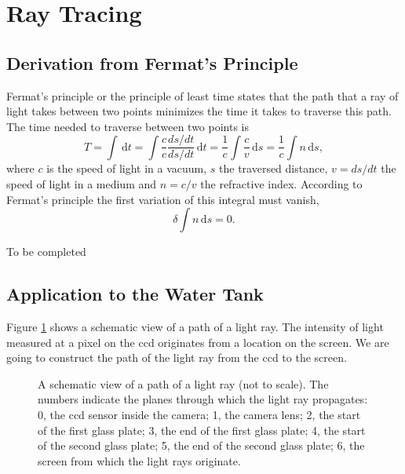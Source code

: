 \documentclass{article}
\begin{document}
\section{Ray Tracing}

\subsection{Derivation from Fermat's Principle}
Fermat's principle or the principle of least time states that the path that a ray of light takes between two points minimizes the time it takes to traverse this path. The time needed to traverse between two points is
\begin{equation}
	T = \int \! \, \mathrm{d}t = \int \! \frac{c}{c} \frac{d s / d t}{d s / d t} \, \mathrm{d}t = \frac{1}{c} \int \! \frac{c}{v} \, \mathrm{d}s = \frac{1}{c} \int \! n \, \mathrm{d}s,
	\end{equation}
where $c$ is the speed of light in a vacuum, $s$ the traversed distance, $v = d s / d t$ the speed of light in a medium and $n = c / v$ the refractive index. According to Fermat's principle the first variation of this integral must vanish,
\begin{equation}
	\delta \int \! n \, \mathrm{d} s = 0.
\end{equation}

\vspace{1cm}
To be completed 
\vspace{1cm}

\subsection{Application to the Water Tank}
Figure \ref{fig:schviepalira} shows a schematic view of a path of a light ray. The intensity of light measured at a pixel on the ccd originates from a location on the screen. We are going to construct the path of the light ray from the ccd to the screen.

\begin{figure}[hpbt]
	
	\caption{A schematic view of a path of a light ray (not to scale). The numbers indicate the planes through which the light ray propagates: 0, the ccd sensor inside the camera; 1, the camera lens; 2, the start of the first glass plate; 3, the end of the first glass plate; 4, the start of the second glass plate; 5, the end of the second glass plate; 6, the screen from which the light rays originate.}	
	\label{fig:schviepalira}
\end{figure}
\end{document}
